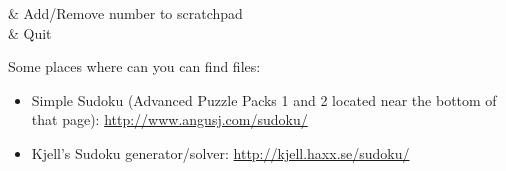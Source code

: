 \begin{table}
\begin{btnmap}{}{}
    & Add/Remove number to scratchpad\\
    & Quit\\
    \end{btnmap}
\end{table}

Some places where can you can find  files:
\begin{itemize}
\item Simple Sudoku (Advanced Puzzle Packs 1 and 2 located near the bottom of that page):
\url{http://www.angusj.com/sudoku/}
\item Kjell's Sudoku generator/solver:
\url{http://kjell.haxx.se/sudoku/}
\end{itemize}
